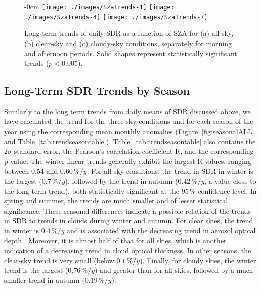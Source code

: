 \documentclass[applsci,article,submit,moreauthors,pdftex]{Definitions/mdpi}
\begin{document}
\begin{figure}[h!]
    \begin{adjustwidth}{-\extralength}{0cm}
        {\centering 
                {\texttt{[image: ./images/SzaTrends-1]}}\hfill
                {\texttt{[image: ./images/SzaTrends-4]}}\hfill
                {\texttt{[image: ./images/SzaTrends-7]}}
        }
    \end{adjustwidth}
    \caption{Long-term trends of daily SDR as a function of SZA for (a) all-sky, (b) clear-sky and (c) cloudy-sky conditions, separately for morning and afternoon periods. Solid shapes represent statistically significant trends ($p < 0.005$).}\label{fig:szatrends}
\end{figure}

\hypertarget{long-term-sdr-trends-by-season}{%
\subsection{Long-Term SDR Trends by
Season}\label{long-term-sdr-trends-by-season}}

Similarly to the long term trends from daily means of SDR discussed
above, we have calculated the trend for the three sky conditions and for
each season of the year using the corresponding mean monthly anomalies
(Figure~\ref{fig:seasonalALL} and Table~\ref{tab:trendseasontable}).
Table~\ref{tab:trendseasontable} also contains the \(2\sigma\) standard
error, the Pearson's correlation coefficient R, and the corresponding
p-value. The winter linear trends generally exhibit the largest R
values, ranging between \(0.54\) and \(0.60\,\%/y\). For all-sky
conditions, the trend in SDR in winter is the largest (\(0.7\,\%/y\)),
followed by the trend in autumn (\(0.42\,\%/y\), a value close to the
long-term trend), both statistically significant at the \(95\,\%\)
confidence level. In spring and summer, the trends are much smaller and
of lesser statistical significance. These seasonal differences indicate
a possible relation of the trends in SDR to trends in clouds during
winter and autumn. For clear skies, the trend in winter is \(0.4\,\%/y\)
and is associated with the decreasing trend in aerosol optical depth
\citep{Siomos2020}. Moreover, it is almost half of that for all skies,
which is another indication of a decreasing trend in cloud optical
thickness. In other seasons, the clear-sky trend is very small (below
\(0.1\,\%/y\)). Finally, for cloudy skies, the winter trend is the
largest (\(0.76\,\%/y\)) and greater than for all skies, followed by a
much smaller trend in autumn (\(0.19\,\%/y\)).
\end{document}
